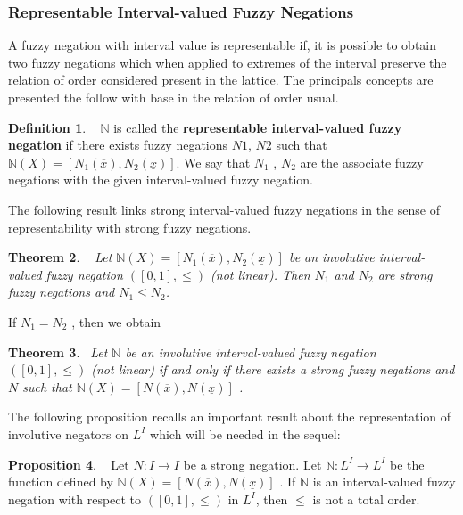 \documentclass[12pt]{article}
\theoremstyle{plain}
\newtheorem{theorem}{Theorem}[section]
\theoremstyle{remark}
\theoremstyle{definition}
\newtheorem{definition}[theorem]{Definition}
\theoremstyle{proposition}
\newtheorem{proposition}[theorem]{Proposition}
\begin{document}
\subsubsection{Representable Interval-valued Fuzzy Negations}

A fuzzy negation with interval value is representable if, it is possible to obtain two fuzzy negations which when applied to extremes of the interval preserve the relation of order considered present in the lattice. The  principals concepts are presented the follow with base in the relation of order usual.
\\
\begin{definition}~\cite[Def. 4]{NEG1} $\mathbb{N}$ is called the \textbf{representable interval-valued fuzzy negation} if there exists fuzzy negations $N1$, $N2$ such that $\mathbb{N}(X) = [N_{1}(\overline{x}), N_{2}(\underline{x})]$. We say that $N_{1}$ , $N_{2}$ are the associate fuzzy negations with the given interval-valued fuzzy
negation.
\end{definition}

The following result links strong interval-valued fuzzy negations in the sense of representability with strong fuzzy negations.\\

\begin{theorem}~\cite{bedregal2010interval}
Let $\mathbb{N}(X) = [N_{1}(\overline{x}), N_{2}(\underline{x})]$ be an involutive interval-valued fuzzy negation $([0, 1],\le)$ (not linear). Then $N_{1}$ and $N_{2}$ are strong fuzzy negations and $N_{1} \le N_{2}$.
\end{theorem}

If $N_{1} = N_{2}$ , then we obtain\\

\begin{theorem}~\cite{bedregal2010interval}\label{nth2}
Let $\mathbb{N}$ be an involutive interval-valued fuzzy negation $([0, 1],\le)$ (not linear) if and only if there exists a strong fuzzy negations and $N$ such that $\mathbb{N}(X) = [N(\overline{x}), N(\underline{x})]$ .
\end{theorem}
The following proposition recalls an important result about the representation
of involutive negators on $L^I$ which will be needed in the sequel:
\\
\begin{proposition}~\cite[Prop. 1]{NEG1} Let $N:I \rightarrow I$ be a strong negation. Let $\mathbb{N}: L^I \rightarrow L^I$ be the function defined by
$\mathbb{N}(X) = [N(\overline{x}), N(\underline{x})]$ .
If $\mathbb{N}$ is an interval-valued fuzzy negation with respect to $([0, 1],\le)$ in $L^I$, then $\le$ is not a total order.
\end{proposition}
\end{document}
